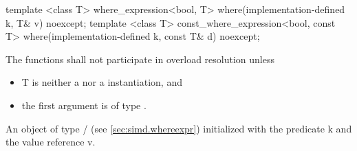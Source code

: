 \begin{itemdecl}
template <class T> where_expression<bool, T> where(implementation-defined k, T& v) noexcept;
template <class T>
const_where_expression<bool, const T> where(implementation-defined k, const T& d) noexcept;
\end{itemdecl}
\begin{itemdescr}
  \pnum\remarks The functions shall not participate in overload resolution unless
  \begin{itemize}
    \item \type T is neither a \simd nor a \mask instantiation, and
    \item the first argument is of type \bool.
  \end{itemize}
  \pnum\returns An object of type / (see \ref{sec:simd.whereexpr}) initialized with the predicate \code k and the value reference \code v.
\end{itemdescr}


